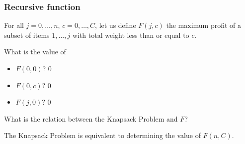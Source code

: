 \documentclass{beamer}
\begin{document}
\begin{frame}
  \frametitle{Recursive function}

  For all $j = 0, \dots, n$, $c = 0, \dots, C$, let us define \alert{$F(j, c)$} the maximum profit of a subset of items $1, \dots, j$ with total weight less than or equal to $c$.

  \bigskip

  \pause
  What is the value of
  \begin{itemize}
    \item $F(0, 0)$? \pause $0$ \pause
    \item $F(0, c)$? \pause $0$ \pause
    \item $F(j, 0)$? \pause $0$ \pause
  \end{itemize}

  \bigskip

  What is the relation between the Knapsack Problem and $F$? \pause

  The Knapsack Problem is equivalent to determining the value of $F(n, C)$.
\end{frame}
\end{document}
